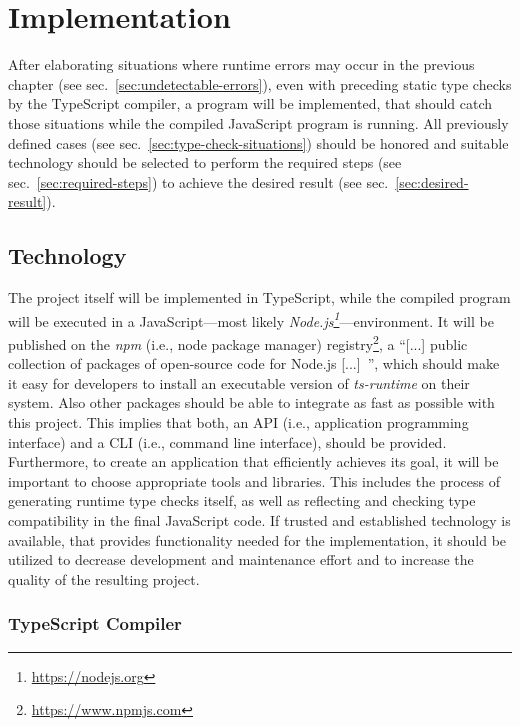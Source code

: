 \chapter{Implementation}
\label{cha:implementation}

After elaborating situations where runtime errors may occur in the previous chapter (see sec.~\ref{sec:undetectable-errors}), even with preceding static type checks by the TypeScript compiler, a program will be implemented, that should catch those situations while the compiled JavaScript program is running. All previously defined cases (see sec.~\ref{sec:type-check-situations}) should be honored and suitable technology should be selected to perform the required steps (see sec.~\ref{sec:required-steps}) to achieve the desired result (see sec.~\ref{sec:desired-result}).

\section{Technology}
\label{sec:technology}

The project itself will be implemented in TypeScript, while the compiled program will be executed in a JavaScript---most likely \emph{Node.js\footnote{\url{https://nodejs.org}}}---environment. It will be published on the \emph{npm} (i.e., node package manager) registry\footnote{\url{https://www.npmjs.com}}, a ``[...] public collection of packages of open-source code for Node.js [...]~\cite{npmjs:about}'', which should make it easy for developers to install an executable version of \emph{ts-runtime} on their system. Also other packages should be able to integrate as fast as possible with this project. This implies that both, an API (i.e., application programming interface) and a CLI (i.e., command line interface), should be provided. Furthermore, to create an application that efficiently achieves its goal, it will be important to choose appropriate tools and libraries. This includes the process of generating runtime type checks itself, as well as reflecting and checking type compatibility in the final JavaScript code. If trusted and established technology is available, that provides functionality needed for the implementation, it should be utilized to decrease development and maintenance effort and to increase the quality of the resulting project.

\subsection{TypeScript Compiler}
\label{sec:typescript-compiler}

